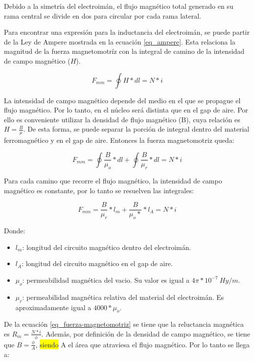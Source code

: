 \noindent Debido a la simetría del electroimán, el flujo magnético total generado en su rama central se divide en dos para circular por cada rama lateral.

\noindent Para encontrar una expresión para la inductancia del electroimán, se puede partir de la Ley de Ampere mostrada en la ecuación \ref{eq_ampere}. Esta relaciona la magnitud de la fuerza magnetomotríz con la integral de camino de la intensidad de campo magnético ($H$).

\begin{equation} \label{eq_ampere}
	F_{mm}=\oint{H*dl}=N*i
\end{equation}

\noindent La intensidad de campo magnético depende del medio en el que se propague el flujo magnético. Por lo tanto, en el núcleo será distinta que en el gap de aire. Por ello es conveniente utilizar la densidad de flujo magnético (B), cuya relación es $H=\frac{B}{\mu}$. De esta forma, se puede separar la porción de integral dentro del material ferromagnético y en el gap de aire. Entonces la fuerza magnetomotriz queda:

\begin{equation} 
	F_{mm}=\oint{\frac{B}{\mu_{o}}*dl}+\oint{\frac{B}{\mu_{r}}*dl}=N*i
\end{equation}

\noindent Para cada camino que recorre el flujo magnético, la intensidad de campo magnético es constante, por lo tanto se resuelven las integrales:

\begin{equation}
	F_{mm}=\frac{B}{\mu_{r}}*l_{m}+\frac{B}{\mu_{o}*}*l_{A}=N*i
\end{equation}

Donde:
\begin{itemize}
	\item $l_{m}$: longitud del circuito magnético dentro del electroimán.
	\item $l_{A}$: longitud del circuito magnético en el gap de aire.
	\item $\mu_{o}$: permeabilidad magnética del vacio. Su valor es igual a $4 \pi * 10^{-7}\:Hy/m$.
	\item $\mu_{r}$: permeabilidad magnética relativa del material del electroimán. Es aproximadamente igual a $4000 * \mu_{o}$.

\end{itemize}

\noindent De la ecuación \ref{eq_fuerza-magnetomotriz} se tiene que la reluctancia magnética es $R_{m}=\frac{N*i}{\phi}$. Además, por definición de la densidad de campo magnético, se tiene que $B=\frac{\phi}{A}$, \colorbox{yellow}{siendo} A el área que atraviesa el flujo magnético. Por lo tanto se llega a:

